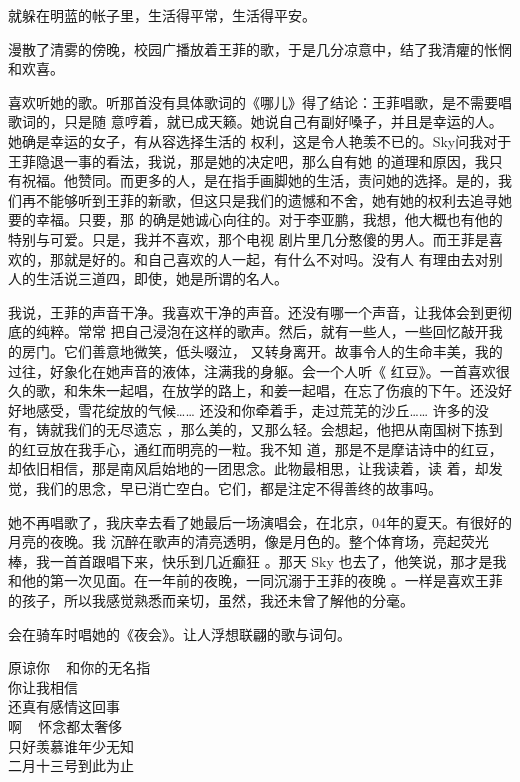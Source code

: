 \documentclass[12pt,a4paper]{article}
\begin{document}
		就躲在明蓝的帐子里，生活得平常，生活得平安。

	\endwriting



		漫散了清雾的傍晚，校园广播放着王菲的歌，于是几分凉意中，结了我清癯的怅惘和欢喜。

		喜欢听她的歌。听那首没有具体歌词的《哪儿》得了结论：王菲唱歌，是不需要唱歌词的，只是随
	意哼着，就已成天籁。她说自己有副好嗓子，并且是幸运的人。她确是幸运的女子，有从容选择生活的
	权利，这是令人艳羡不已的。Sky问我对于王菲隐退一事的看法，我说，那是她的决定吧，那么自有她
	的道理和原因，我只有祝福。他赞同。而更多的人，是在指手画脚她的生活，责问她的选择。是的，我
	们再不能够听到王菲的新歌，但这只是我们的遗憾和不舍，她有她的权利去追寻她要的幸福。只要，那
	的确是她诚心向往的。对于李亚鹏，我想，他大概也有他的特别与可爱。只是，我并不喜欢，那个电视
	剧片里几分憨傻的男人。而王菲是喜欢的，那就是好的。和自己喜欢的人一起，有什么不对吗。没有人
	有理由去对别人的生活说三道四，即使，她是所谓的名人。

		我说，王菲的声音干净。我喜欢干净的声音。还没有哪一个声音，让我体会到更彻底的纯粹。常常
	把自己浸泡在这样的歌声。然后，就有一些人，一些回忆敲开我的房门。它们善意地微笑，低头啜泣，
	又转身离开。故事令人的生命丰美，我的过往，好象化在她声音的液体，注满我的身躯。会一个人听《
	红豆》。一首喜欢很久的歌，和朱朱一起唱，在放学的路上，和姜一起唱，在忘了伤痕的下午。还没好
	好地感受，雪花绽放的气候…… 还没和你牵着手，走过荒芜的沙丘…… 许多的没有，铸就我们的无尽遗忘
	，那么美的，又那么轻。会想起，他把从南国树下拣到的红豆放在我手心，通红而明亮的一粒。我不知
	道，那是不是摩诘诗中的红豆，却依旧相信，那是南风启始地的一团思念。此物最相思，让我读着，读
	着，却发觉，我们的思念，早已消亡空白。它们，都是注定不得善终的故事吗。

		她不再唱歌了，我庆幸去看了她最后一场演唱会，在北京，04年的夏天。有很好的月亮的夜晚。我
	沉醉在歌声的清亮透明，像是月色的。整个体育场，亮起荧光棒，我一首首跟唱下来，快乐到几近癫狂
	。那天 Sky 也去了，他笑说，那才是我和他的第一次见面。在一年前的夜晚，一同沉溺于王菲的夜晚
	。一样是喜欢王菲的孩子，所以我感觉熟悉而亲切，虽然，我还未曾了解他的分毫。

		会在骑车时唱她的《夜会》。让人浮想联翩的歌与词句。

		\longpoem{}{}{}
		原谅你 ~ 和你的无名指 \\
		你让我相信 \\
		还真有感情这回事 \\
		啊 ~ 怀念都太奢侈 \\
		只好羡慕谁年少无知 \\
		二月十三号到此为止
		\endlongpoem
\end{document}
